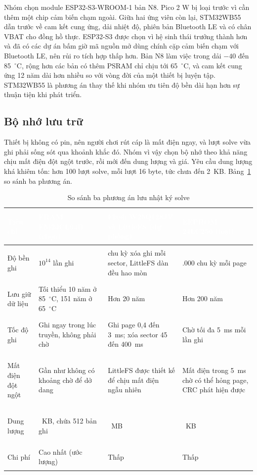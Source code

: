 Nhóm chọn module ESP32-S3-WROOM-1 bản N8. Pico 2 W bị loại trước vì cần thêm một chip cảm biến chạm ngoài. Giữa hai ứng viên còn lại, STM32WB55 dẫn trước về cam kết cung ứng, dải nhiệt độ, phiên bản Bluetooth LE và có chân VBAT cho đồng hồ thực. ESP32-S3 được chọn vì hệ sinh thái trưởng thành hơn và đã có các dự án bấm giờ mã nguồn mở dùng chính cặp cảm biến chạm với Bluetooth LE, nên rủi ro tích hợp thấp hơn. Bản N8 làm việc trong dải $-40$ đến 85~$^{\circ}$C, rộng hơn các bản có thêm PSRAM chỉ chịu tới 65~$^{\circ}$C, và cam kết cung ứng 12 năm dài hơn nhiều so với vòng đời của một thiết bị luyện tập. STM32WB55 là phương án thay thế khi nhóm ưu tiên độ bền dài hạn hơn sự thuận tiện khi phát triển.

\subsection{Bộ nhớ lưu trữ}
Thiết bị không có pin, nên người chơi rút cáp là mất điện ngay, và lượt solve vừa ghi phải sống sót qua khoảnh khắc đó. Nhóm vì vậy chọn bộ nhớ theo khả năng chịu mất điện đột ngột trước, rồi mới đến dung lượng và giá. Yêu cầu dung lượng khá khiêm tốn: hơn 100 lượt solve, mỗi lượt 16 byte, tức chưa đến 2~KB. Bảng~\ref{tab:storage} so sánh ba phương án.

\begin{table}[H]
    \centering
    \small
    \renewcommand{\arraystretch}{1.4}
    \caption{So sánh ba phương án lưu nhật ký solve}
    \label{tab:storage}
    \begin{tabular}{>{\bfseries\raggedright\arraybackslash}m{2.6cm} >{\raggedright\arraybackslash}m{3.7cm} >{\raggedright\arraybackslash}m{3.9cm} >{\raggedright\arraybackslash}m{3.2cm}}
        \toprule
        \rowcolor{haitayblue}
        \textcolor{white}{Tiêu chí} & \textcolor{white}{FRAM FM24CL64B (chọn)} & \textcolor{white}{Flash W25Q128JV và LittleFS (dự phòng)} & \textcolor{white}{EEPROM 24LC256 (loại)} \\
        \midrule
        \rowcolor{haitayblue!8}
        Độ bền ghi & $10^{14}$ lần ghi & 100.000 chu kỳ xóa ghi mỗi sector, LittleFS dàn đều hao mòn & 1.000.000 chu kỳ mỗi page \\
        Lưu giữ dữ liệu & Tối thiểu 10 năm ở 85~$^{\circ}$C, 151 năm ở 65~$^{\circ}$C & Hơn 20 năm & Hơn 200 năm \\
        \rowcolor{haitayblue!8}
        Tốc độ ghi & Ghi ngay trong lúc truyền, không phải chờ & Ghi page 0,4 đến 3~ms; xóa sector 45 đến 400~ms & Chờ tối đa 5~ms mỗi lần ghi \\
        Mất điện đột ngột & Gần như không có khoảng chờ để dở dang & LittleFS được thiết kế để chịu mất điện ngẫu nhiên & Mất điện trong 5~ms chờ có thể hỏng page, CRC phát hiện được \\
        \rowcolor{haitayblue!8}
        Dung lượng & 8~KB, chứa 512 bản ghi & 16~MB & 32~KB \\
        Chi phí & Cao nhất (ước lượng) & Thấp & Thấp \\
        \bottomrule
    \end{tabular}
\end{table}


